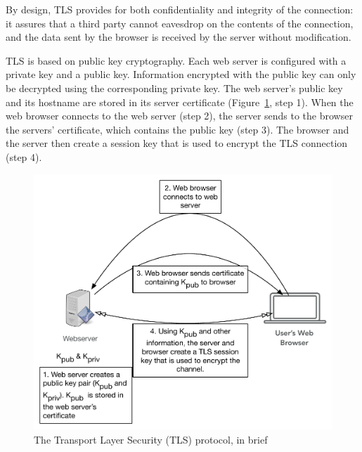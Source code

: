\documentclass[fleqn,10pt]{wlscirep}
\begin{document}
By design, TLS
provides for both confidentiality and integrity of the connection: it
assures that a third party cannot eavesdrop on the contents of the
connection, and the data sent by the browser is received by the server
without modification.

TLS is based on public key cryptography. Each web server is configured
with a private key and a public key. Information encrypted with the
public key can only be decrypted using the corresponding private
key. The web server's public key and its hostname are stored in its
server certificate (Figure~\ref{tls}, step 1). When the web browser
connects to the web server (step 2), the server sends to the browser
the servers' certificate, which contains the public key (step 3). The
browser and the server then create a session key that is used to
encrypt the TLS connection (step 4).

\begin{figure}
  \includegraphics[width=\textwidth]{art/tls.pdf}
  \caption{The Transport Layer Security (TLS) protocol, in brief}\label{tls}
  \end{figure}
\end{document}

